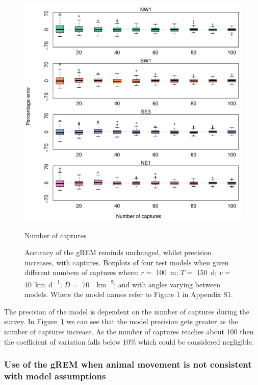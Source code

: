 \documentclass[a4paper,10pt,reqno,oneside]{amsart}
\begin{document}
\begin{figure}[t]
       \centering
	\includegraphics[width=1\textwidth]{imgs/ResultsNoCaptures.pdf}
         \caption{Number of captures}
           \label{f:Captures}
        \caption{Accuracy of the gREM reminds unchanged, whilst precision increases, with captures. Boxplots of four test models when given different numbers of captures where: $r = $ \SI{100}{\meter}; $T = $ \SI{150}{\day}; $v = $ \SI{40}{\kilo\meter\per\day}; $D = $ \SI{70}{\animals\per\kilo\meter\squared}; and with angles varying between models. Where the model names refer to Figure 1 in Appendix S1.} 
\end{figure}

The precision of the model is dependent on the number of captures during the survey. In Figure~\ref{f:Captures} we can see that the model precision gets greater as the number of captures increase. As the number of captures reaches about 100 then the coefficient of variation falls below 10\% which could be considered negligible. %

\subsubsection{Use of the gREM when animal movement is not consistent with model assumptions}
\end{document}
